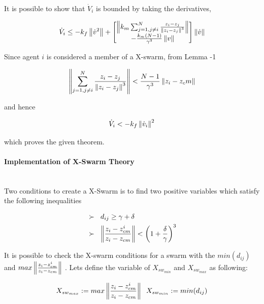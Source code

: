 It is possible to show that $\dot{V}_i$ is bounded by taking the derivatives,
			
\begin{equation}
\dot{V}_i \leq -k_f \left\lVert\dot{v}^2\right\rVert + \begin{bmatrix}
\left\lVert k_m \sum_{j=1, j \neq i}^{N} \frac{z_i - z_j}{\left\lVert z_i - z_j\right\rVert^3}\right\rVert \\
- \frac{k_m(N-1)}{\gamma ^3} \left\lVert v\right\rVert
\end{bmatrix} \left\lVert\dot{v}\right\rVert
\end{equation}
			
Since agent $i$ is considered a member of a X-swarm, from Lemma -1

\begin{equation}
\left\lVert \sum_{j=1, j \neq i}^{N} \frac{z_i - z_j}{\left\lVert z_i - z_j\right\rVert^3}\right\rVert < \frac{N-1}{\gamma^3} \left\lVert z_i - z_cm\right\rVert
\end{equation}

and hence

\begin{equation}
\dot{V}_i < -k_f \left\lVert\dot{v}_i\right\rVert ^2
\end{equation}

which proves the given theorem.  \newline

\paragraph{Implementation of X-Swarm Theory}\hspace{0pt} \\		
Two conditions to create a X-Swarm is to find two positive variables which satisfy the following inequalities

\begin{align*}
&\succ\hspace{0.2cm}  d_{ij} \geq \gamma + \delta \\
&\succ \hspace{0.2cm}   \left\lVert\frac{z_i - z_{cm}^i}{z_i - z_{cm}}\right\rVert < \left(1+\frac{\delta}{\gamma}\right)^3
\end{align*}
		
It is possible to check the X-swarm conditions for a swarm  with the $min(d_{ij})$ and $max \left\lVert\frac{z_i - z_{cm}^i}{z_i - z_{cm}}\right\rVert $ . Lets define the variable  of $X_{sw_{min}}$ and $X_{sw_{max}}$ as following:

\begin{equation}
X_{sw_{max}} := max \left\lVert\frac{z_i - z_{cm}^i}{z_i - z_{cm}}\right\rVert  \hspace{0.2cm} X_{sw_{min}} := min(d_{ij})
\end{equation}

